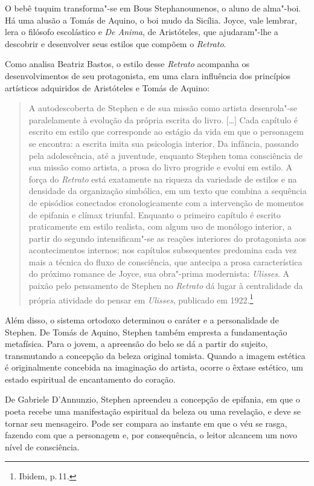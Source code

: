 O bebê tuquim transforma"-se em Bous Stephanoumenos, o aluno de alma"-boi.
Há uma alusão a Tomás de Aquino, o boi mudo da Sicília.
Joyce, vale lembrar, lera o filósofo escolástico e \textit{De Anima}, de
Aristóteles, que ajudaram"-lhe a descobrir e desenvolver seus estilos
que compõem o \textit{Retrato}.

Como analisa Beatriz Bastos, o estilo desse \textit{Retrato} acompanha os desenvolvimentos de seu protagonista, em uma clara influência dos princípios artísticos adquiridos de Aristóteles e Tomás de Aquino:

\begin{quote}
A autodescoberta de Stephen e de sua missão como artista desenrola"-se
paralelamente à evolução da própria escrita do livro. [\ldots] Cada capítulo é
escrito em estilo que corresponde ao estágio da vida em que o
personagem se encontra: a escrita imita sua psicologia interior. Da
infância, passando pela adolescência, até a juventude, enquanto Stephen
toma consciência de sua missão como artista, a prosa do livro progride
e evolui em estilo. A força do \textit{Retrato} está exatamente na
riqueza da variedade de estilos e na densidade da organização
simbólica, em um texto que combina a sequência de episódios conectados
cronologicamente com a intervenção de momentos de epifania e clímax
triunfal. Enquanto o primeiro capítulo é escrito praticamente em estilo
realista, com algum uso de monólogo interior, a partir do segundo 
intensificam"-se as reações interiores do protagonista aos
acontecimentos internos; nos capítulos subsequentes predomina cada vez
mais a técnica do fluxo de consciência, que antecipa a prosa
característica do próximo romance de Joyce, sua obra"-prima modernista:
\textit{Ulisses}. A paixão pelo pensamento de Stephen no
\textit{Retrato} dá lugar à centralidade da própria atividade do pensar
em \textit{Ulisses}, publicado em 1922.\footnote{Ibidem, p.\,11.}
\end{quote}

Além disso, o sistema ortodoxo determinou o caráter e a personalidade de Stephen. De
Tomás de Aquino, Stephen também empresta a fundamentação metafísica. Para o
jovem, a apreensão do belo se dá a partir do sujeito, transmutando a
concepção da beleza original tomista. Quando a imagem estética é
originalmente concebida na imaginação do artista, ocorre o êxtase
estético, um estado espiritual de encantamento do coração.

De Gabriele D'Annunzio, Stephen apreendeu a concepção de epifania, em
que o poeta recebe uma manifestação espiritual da beleza ou uma
revelação, e deve se tornar seu mensageiro. Pode ser compara ao instante
em que o véu se rasga, fazendo com que a personagem e, por consequência,
o leitor alcancem um novo nível de consciência.

